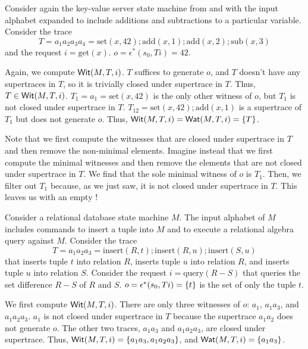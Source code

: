 \begin{example}
  \newcommand{\Mget}{\text{get}}
  \newcommand{\Mset}{\text{set}}
  \newcommand{\Madd}{\text{add}}
  \newcommand{\Msub}{\text{sub}}
  Consider again the key-value server state machine from
   and  with the input
  alphabet expanded to include additions and subtractions to a particular
  variable. Consider the trace
  \[
    T = a_1 a_2 a_3 a_4 = \Mset(x, 42); \Madd(x, 1); \Madd(x, 2); \Msub(x, 3)
  \]
  and the request $i = \Mget(x)$. $o = \epsilon^*(s_0, Ti) = 42$.

  Again, we compute $\textsf{Wit}(M, T, i)$. $T$ suffices to generate $o$, and $T$
  doesn't have any supertraces in $T$, so it is trivially closed under
  supertrace in $T$. Thus, $T \in \textsf{Wit}(M, T, i)$.
  $T_1 = a_1 = \Mset(x, 42)$ is the only other witness of $o$, but $T_1$ is not
  closed under supertrace in $T$. $T_{12} = \Mset(x, 42); \Madd(x, 1)$ is a
  supertrace of $T_1$ but does not generate $o$.
  Thus, $\textsf{Wit}(M, T, i) = \textsf{Wat}(M, T, i) = \{T\}$.

  Note that we first compute the witnesses that are closed under supertrace in
  $T$ and then remove the non-minimal elements. Imagine instead that we first
  compute the minimal witnesses and then remove the elements that are not
  closed under supertrace in $T$. We find that the sole minimal witness of $o$
  is $T_1$. Then, we filter out $T_1$ because, as we just saw, it is not closed
  under supertrace in $T$. This leaves us with an empty \watprovenance{}!
\end{example}

\begin{example}
  \newcommand{\Mins}{\text{insert}}
  \newcommand{\Mquery}{\text{query}}
  Consider a relational database state machine $M$. The input alphabet of $M$
  includes commands to insert a tuple into $M$ and to execute a relational
  algebra query against $M$. Consider the trace
  \[
    T = a_1 a_2 a_3 = \Mins(R, t); \Mins(R, u); \Mins(S, u)
  \]
  that inserts tuple $t$ into relation $R$, inserts tuple $u$ into relation
  $R$, and inserts tuple $u$ into relation $S$. Consider the request $i =
  \Mquery(R - S)$ that queries the set difference $R - S$ of $R$ and $S$. $o =
  \epsilon^*(s_0, Ti) = \{t\}$ is the set of only the tuple $t$.

  We first compute $\textsf{Wit}(M, T, i)$. There are only three witnesses of $o$:
  $a_1$, $a_1a_3$, and $a_1a_2a_3$.  $a_1$ is not closed under supertrace in
  $T$ because the supertrace $a_1a_2$ does not generate $o$. The other two
  traces, $a_1a_3$ and $a_1a_2a_3$, are closed under supertrace. Thus, $\textsf{Wit}(M,
  T, i) = \{a_1a_3, a_1a_2a_3\}$, and $\textsf{Wat}(M, T, i) = \{a_1a_3\}$.
\end{example}

